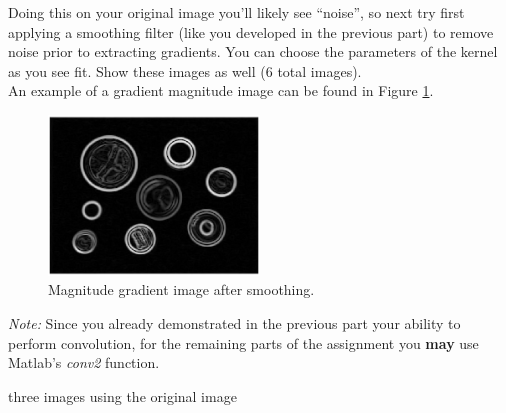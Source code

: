 \documentclass[12pt]{article}
\begin{document}
\noindent
Doing this on your original image you’ll likely see “noise”, so next try first applying a smoothing filter (like you developed in the previous part) to remove noise prior to extracting gradients.  You can choose the parameters of the kernel as you see fit.   Show these images as well (6 total images).\\

\noindent
An example of a gradient magnitude image can be found in Figure \ref{fig2}.

\begin{figure}[H]
\begin{center}
\includegraphics[width=0.5\textwidth]{part3.png}
\caption{Magnitude gradient image after smoothing.}
\label{fig2}
\end{center}
\end{figure}

\noindent
\emph{Note:}  Since you already demonstrated in the previous part your ability to perform convolution, for the remaining parts of the assignment you \textbf{may} use Matlab’s \emph{conv2} function. 

\newpage

three images using the original image\\
\end{document}
